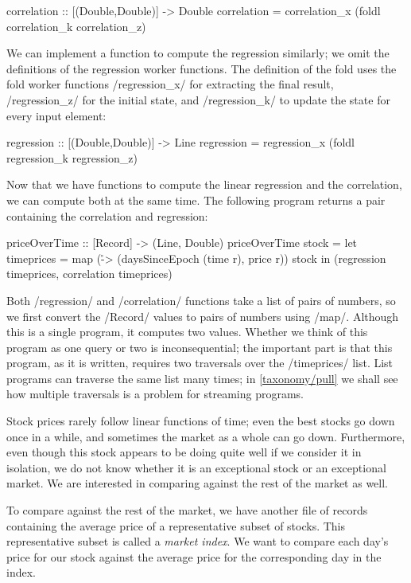 \begin{haskell}
correlation :: [(Double,Double)] -> Double
correlation = correlation_x (foldl correlation_k correlation_z)
\end{haskell}


We can implement a function to compute the regression similarly; we omit the definitions of the regression worker functions.
The definition of the fold uses the fold worker functions \Hs/regression_x/ for extracting the final result, \Hs/regression_z/ for the initial state, and \Hs/regression_k/ to update the state for every input element:

\begin{haskell}
regression :: [(Double,Double)] -> Line
regression = regression_x (foldl regression_k regression_z)
\end{haskell}

Now that we have functions to compute the linear regression and the correlation, we can compute both at the same time.
The following program returns a pair containing the correlation and regression:

\begin{haskell}
priceOverTime :: [Record] -> (Line, Double)
priceOverTime stock =
  let timeprices = map (\r -> (daysSinceEpoch (time r), price r)) stock
  in (regression timeprices, correlation timeprices)
\end{haskell}

Both \Hs/regression/ and \Hs/correlation/ functions take a list of pairs of numbers, so we first convert the \Hs/Record/ values to pairs of numbers using \Hs/map/.
Although this is a single program, it computes two values.
Whether we think of this program as one query or two is inconsequential; the important part is that this program, as it is written, requires two traversals over the \Hs/timeprices/ list.
List programs can traverse the same list many times; in \cref{taxonomy/pull} we shall see how multiple traversals is a problem for streaming programs.

Stock prices rarely follow linear functions of time; even the best stocks go down once in a while, and sometimes the market as a whole can go down.
Furthermore, even though this stock appears to be doing quite well if we consider it in isolation, we do not know whether it is an exceptional stock or an exceptional market.
We are interested in comparing against the rest of the market as well.

To compare against the rest of the market, we have another file of records containing the average price of a representative subset of stocks.
This representative subset is called a \emph{market index}.
We want to compare each day's price for our stock against the average price for the corresponding day in the index.

